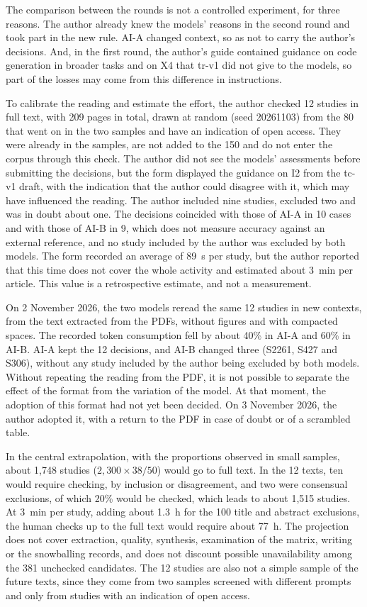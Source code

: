 The comparison between the rounds is not a controlled experiment, for three reasons. The author already knew the
models' reasons in the second round and took part in the new rule. AI-A changed context, so as not to carry
the author's decisions. And, in the first round, the author's guide contained guidance on code generation
in broader tasks and on X4 that tr-v1 did not give to the models, so part of the losses may come
from this difference in instructions.

To calibrate the reading and estimate the effort, the author checked 12 studies in full text, with 209
pages in total, drawn at random (seed 20261103) from the 80 that went on in the two samples and have an indication
of open access. They were already in the samples, are not added to the 150 and do not enter the corpus through this
check. The author did not see the models' assessments before submitting the decisions, but the form
displayed the guidance on I2 from the tc-v1 draft, with the indication that the author could disagree with it, which may have
influenced the reading. The author included nine
studies, excluded two and was in doubt about one. The decisions coincided with those of AI-A in 10 cases and with
those of AI-B in 9, which does not measure accuracy against an external reference, and no study included by the
author was excluded by both models. The form recorded an average of 89~s per study, but the author
reported that this time does not cover the whole activity and estimated about 3~min per article. This value is a
retrospective estimate, and not a measurement.

On 2 November 2026, the two models reread the same 12 studies in new contexts, from the text extracted
from the PDFs, without figures and with compacted spaces. The recorded token consumption fell by about 40\%
in AI-A and 60\% in AI-B. AI-A kept the 12 decisions, and AI-B changed three (S2261, S427 and S306), without any
study included by the author being excluded by both models. Without repeating the reading from the PDF, it is not possible
to separate the effect of the format from the variation of the model. At that moment, the adoption of this format had not yet been
decided. On 3 November 2026, the author adopted it, with a return to the PDF in case of doubt or of a scrambled table.

In the central extrapolation, with the proportions observed in small samples, about 1,748 studies
($2{,}300 \times 38/50$) would go to full text. In the 12 texts, ten would require checking, by inclusion or
disagreement, and two were consensual exclusions, of which 20\% would be checked, which leads to about 1,515
studies. At 3~min per study, adding about 1.3~h for the 100 title and abstract exclusions, the human
checks up to the full text would require about 77~h. The projection does not cover extraction, quality, synthesis, examination
of the matrix, writing or the snowballing records, and does not discount possible unavailability among
the 381 unchecked candidates. The 12 studies are also not a simple sample of the future texts, since
they come from two samples screened with different prompts and only from studies with an indication of open access.

